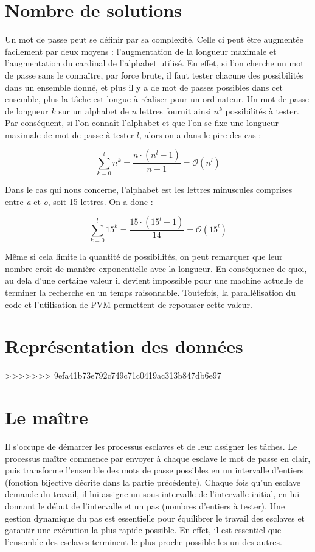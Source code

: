 \documentclass[a4paper,11pt]{article}
\begin{document}
\section{Nombre de solutions}

Un mot de passe peut se définir par sa complexité. Celle ci peut être augmentée facilement par deux moyens : l'augmentation de la longueur maximale et l'augmentation du cardinal de l'alphabet utilisé. En effet, si l'on cherche un mot de passe sans le connaître, par force brute, il faut tester chacune des possibilités dans un ensemble donné, et plus il y a de mot de passes possibles dans cet ensemble, plus la tâche est longue à réaliser pour un ordinateur. Un mot de passe de longueur $k$ sur un alphabet de $n$ lettres fournit ainsi $n^k$ possibilités à tester. Par conséquent, si l'on connaît l'alphabet et que l'on se fixe une longueur maximale de mot de passe à tester $l$, alors on a dans le pire des cas :

\[
\sum_{k=0}^{l}n^k = \frac{n \cdot (n^l - 1)}{n - 1} = \mathcal{O}(n^l)
\]

Dans le cas qui nous concerne, l'alphabet est les lettres minuscules comprises entre \emph{a} et \emph{o}, soit 15 lettres. On a donc :

\[
\sum_{k=0}^{l}15^k = \frac{15 \cdot (15^l - 1)}{14} = \mathcal{O}(15^l)
\]

Même si cela limite la quantité de possibilités, on peut remarquer que leur nombre croît de manière exponentielle avec la longueur. En conséquence de quoi, au dela d'une certaine valeur il devient impossible pour une machine actuelle de terminer la recherche en un temps raisonnable. Toutefois, la parallèlisation du code et l'utilisation de PVM permettent de repousser cette valeur.

\section{Représentation des données}

>>>>>>> 9efa41b73e792c749c71c0419ac313b847db6e97


\section{Le maître}
Il s'occupe de démarrer les processus esclaves et de leur assigner les tâches. Le processus maître commence par envoyer à chaque esclave le mot de passe en clair, puis transforme l'ensemble des mots de passe possibles en un intervalle d'entiers (fonction bijective décrite dans la partie précédente). Chaque fois qu'un esclave demande du travail, il lui assigne un sous intervalle de l'intervalle initial, en lui donnant le début de l'intervalle et un pas (nombres d'entiers à tester).
Une gestion dynamique du pas est essentielle pour équilibrer le travail des esclaves et garantir une exécution la plus rapide possible. En effet, il est essentiel que l'ensemble des esclaves terminent le plus proche possible les un des autres.
\end{document}
